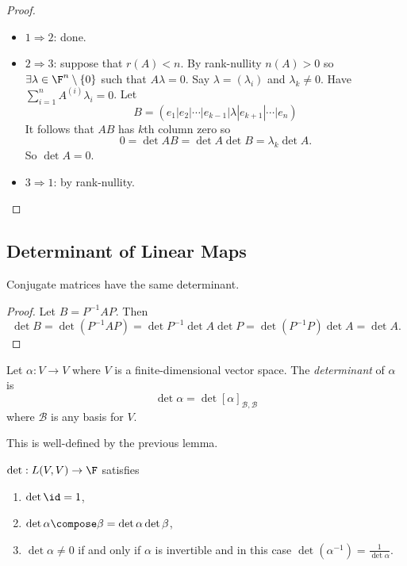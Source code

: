 \documentclass[a4paper]{article}
\newcommand*{\basis}{\mathcal}
\theoremstyle{definition}
\begin{document}
\begin{proof}\leavevmode
  \begin{itemize}
  \item \(1 \Rightarrow 2\): done.
  \item \(2 \Rightarrow 3\): suppose that \(r(A) < n\). By rank-nullity \(n(A) > 0\) so \(\exists \lambda \in \F^n \setminus \{0\}\) such that \(A \lambda = 0\). Say \(\lambda = (\lambda_i)\) and \(\lambda_k \neq 0\). Have \(\sum_{i = 1}^{n}A^{(i)}\lambda_i = 0 \). Let
    \[
      B= (e_1|e_2|\cdots|e_{k-1}|\lambda|e_{k+1}|\cdots|e_n)
    \]
    It follows that \(AB\) has \(k\)th column zero so
    \[
      0 = \det AB = \det A \det B = \lambda_k \det A.
    \]
    So \(\det A = 0\).
  \item \(3 \Rightarrow 1\): by rank-nullity.
  \end{itemize}
\end{proof}

\subsection{Determinant of Linear Maps}

\begin{lemma}
  Conjugate matrices have the same determinant.
\end{lemma}

\begin{proof}
  Let \(B = P^{-1}AP\). Then
  \[
    \det B = \det (P^{-1}AP) = \det P^{-1} \det A \det P = \det (P^{-1}P) \det A = \det A.
  \]
\end{proof}

\begin{definition}[Determinant]
  Let \(\alpha: V \to V\) where \(V\) is a finite-dimensional vector space. The \emph{determinant} of \(\alpha\) is
  \[
    \det \alpha = \det [\alpha]_{\basis B, \basis B}
  \]
  where \(\basis B\) is any basis for \(V\). 
\end{definition}
This is well-defined by the previous lemma.

\begin{theorem}
  \(\det: L(V, V) \to \F\) satisfies
  \begin{enumerate}
  \item \(\det \id = 1\),
  \item \(\det \alpha \compose \beta = \det \alpha \det \beta\),
  \item \(\det \alpha \neq 0\) if and only if \(\alpha\) is invertible and in this case \(\det (\alpha^{-1}) = \frac{1}{\det \alpha}\).
  \end{enumerate}
\end{theorem}
\end{document}
